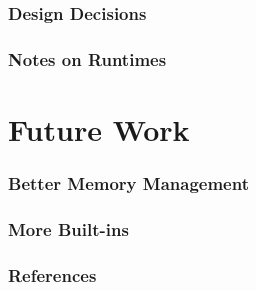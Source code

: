 \documentclass{beamer}
\begin{document}
\begin{frame}
\frametitle{Design Decisions}
\end{frame}

\begin{frame}
\frametitle{Notes on Runtimes}
\end{frame}

\section{Future Work}

\begin{frame}
\frametitle{Better Memory Management}
\end{frame}

\begin{frame}
\frametitle{More Built-ins}
\end{frame}


\begin{frame}
\frametitle{References}
\end{frame}
\end{document}

